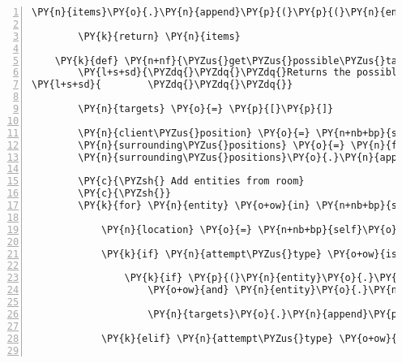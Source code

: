 \begin{Verbatim}[commandchars=\\\{\},numbers=left,firstnumber=1,stepnumber=1]
                \PY{n}{items}\PY{o}{.}\PY{n}{append}\PY{p}{(}\PY{p}{(}\PY{n}{entity}\PY{p}{,} \PY{n}{entity}\PY{o}{.}\PY{n}{identifier}\PY{p}{)}\PY{p}{)}

        \PY{k}{return} \PY{n}{items}

    \PY{k}{def} \PY{n+nf}{\PYZus{}get\PYZus{}possible\PYZus{}targets}\PY{p}{(}\PY{n+nb+bp}{self}\PY{p}{,} \PY{n}{attempt\PYZus{}type}\PY{p}{)}\PY{p}{:}
        \PY{l+s+sd}{\PYZdq{}\PYZdq{}\PYZdq{}Returns the possible targets for the given interaction type.}
\PY{l+s+sd}{        \PYZdq{}\PYZdq{}\PYZdq{}}

        \PY{n}{targets} \PY{o}{=} \PY{p}{[}\PY{p}{]}

        \PY{n}{client\PYZus{}position} \PY{o}{=} \PY{n+nb+bp}{self}\PY{o}{.}\PY{n}{host}\PY{o}{.}\PY{n}{room}\PY{o}{.}\PY{n}{entity\PYZus{}locations}\PY{p}{[}\PY{n+nb+bp}{self}\PY{o}{.}\PY{n}{host}\PY{o}{.}\PY{n}{client\PYZus{}id}\PY{p}{]}
        \PY{n}{surrounding\PYZus{}positions} \PY{o}{=} \PY{n}{fabula}\PY{o}{.}\PY{n}{surrounding\PYZus{}positions}\PY{p}{(}\PY{n}{client\PYZus{}position}\PY{p}{)}
        \PY{n}{surrounding\PYZus{}positions}\PY{o}{.}\PY{n}{append}\PY{p}{(}\PY{n}{client\PYZus{}position}\PY{p}{)}

        \PY{c}{\PYZsh{} Add entities from room}
        \PY{c}{\PYZsh{}}
        \PY{k}{for} \PY{n}{entity} \PY{o+ow}{in} \PY{n+nb+bp}{self}\PY{o}{.}\PY{n}{host}\PY{o}{.}\PY{n}{room}\PY{o}{.}\PY{n}{entity\PYZus{}dict}\PY{o}{.}\PY{n}{values}\PY{p}{(}\PY{p}{)}\PY{p}{:}

            \PY{n}{location} \PY{o}{=} \PY{n+nb+bp}{self}\PY{o}{.}\PY{n}{host}\PY{o}{.}\PY{n}{room}\PY{o}{.}\PY{n}{entity\PYZus{}locations}\PY{p}{[}\PY{n}{entity}\PY{o}{.}\PY{n}{identifier}\PY{p}{]}

            \PY{k}{if} \PY{n}{attempt\PYZus{}type} \PY{o+ow}{is} \PY{n+nb+bp}{self}\PY{o}{.}\PY{n}{ATTEMPT\PYZus{}TALK\PYZus{}TO}\PY{p}{:}

                \PY{k}{if} \PY{p}{(}\PY{n}{entity}\PY{o}{.}\PY{n}{entity\PYZus{}type} \PY{o+ow}{is} \PY{o+ow}{not} \PY{n}{fabula}\PY{o}{.}\PY{n}{ITEM}
                    \PY{o+ow}{and} \PY{n}{entity}\PY{o}{.}\PY{n}{identifier} \PY{o+ow}{is} \PY{o+ow}{not} \PY{n+nb+bp}{self}\PY{o}{.}\PY{n}{host}\PY{o}{.}\PY{n}{client\PYZus{}id}\PY{p}{)}\PY{p}{:}

                    \PY{n}{targets}\PY{o}{.}\PY{n}{append}\PY{p}{(}\PY{p}{(}\PY{n}{entity}\PY{p}{,} \PY{n}{location}\PY{p}{)}\PY{p}{)}

            \PY{k}{elif} \PY{n}{attempt\PYZus{}type} \PY{o+ow}{is} \PY{n+nb+bp}{self}\PY{o}{.}\PY{n}{ATTEMPT\PYZus{}LOOK\PYZus{}AT}\PY{p}{:}


\end{Verbatim}
